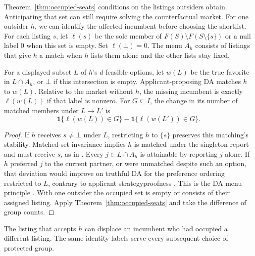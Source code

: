 Theorem~\ref{thm:occupied-seats} conditions on the listings outsiders obtain. Anticipating that set can still require solving the counterfactual market. For one outsider $h$, we can identify the affected incumbent before choosing the shortlist. For each listing $s$, let $\ell(s)$ be the sole member of $F(S)\setminus F(S\setminus\{s\})$ or a null label $0$ when this set is empty. Set $\ell(\bot)=0$. The menu $A_h$ consists of listings that give $h$ a match when $h$ lists them alone and the other lists stay fixed.

\begin{corollary}\label{cor:displacement}
For a displayed subset $L$ of $h$'s $d$ feasible options, let $w(L)$ be the true favorite in $L\cap A_h$, or $\bot$ if this intersection is empty. Applicant-proposing DA matches $h$ to $w(L)$. Relative to the market without $h$, the missing incumbent is exactly $\ell(w(L))$ if that label is nonzero. For $G\subseteq I$, the change in its number of matched members under $L\to L'$ is
\[
 \mathbf1\{\ell(w(L))\in G\}-\mathbf1\{\ell(w(L'))\in G\}.
\]
\end{corollary}
\begin{proof}
If $h$ receives $s\ne\bot$ under $L$, restricting $h$ to $\{s\}$ preserves this matching's stability. Matched-set invariance implies $h$ is matched under the singleton report and must receive $s$, as in \cite{papai2026}. Every $j\in L\cap A_h$ is attainable by reporting $j$ alone. If $h$ preferred $j$ to the current partner, or were unmatched despite such an option, that deviation would improve on truthful DA for the preference ordering restricted to $L$, contrary to applicant strategyproofness \cite{dubins1981}. This is the DA menu principle \cite{ghtmenu}. With one outsider the occupied set is empty or consists of their assigned listing. Apply Theorem~\ref{thm:occupied-seats} and take the difference of group counts.
\end{proof}

The listing that accepts $h$ can displace an incumbent who had occupied a different listing. The same identity labels serve every subsequent choice of protected group.

